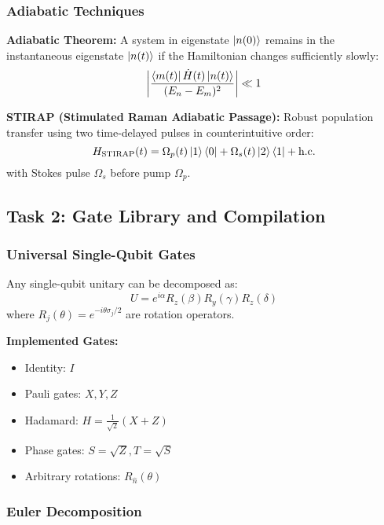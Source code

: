 \documentclass[11pt,a4paper]{article}
\theoremstyle{definition}
\theoremstyle{remark}
\begin{document}
\subsubsection{Adiabatic Techniques}

\textbf{Adiabatic Theorem:} A system in eigenstate $\ket{n(0)}$ remains in the instantaneous eigenstate $\ket{n(t)}$ if the Hamiltonian changes sufficiently slowly:
\begin{equation}
\left|\frac{\bra{m(t)}\dot{H}(t)\ket{n(t)}}{(E_n - E_m)^2}\right| \ll 1
\end{equation}

\textbf{STIRAP (Stimulated Raman Adiabatic Passage):} Robust population transfer using two time-delayed pulses in counterintuitive order:
\begin{equation}
H_{\text{STIRAP}}(t) = \Omega_p(t)\ket{1}\bra{0} + \Omega_s(t)\ket{2}\bra{1} + \text{h.c.}
\end{equation}
with Stokes pulse $\Omega_s$ before pump $\Omega_p$.

\subsection{Task 2: Gate Library and Compilation}

\subsubsection{Universal Single-Qubit Gates}

Any single-qubit unitary can be decomposed as:
\begin{equation}
U = e^{i\alpha}R_z(\beta)R_y(\gamma)R_z(\delta)
\end{equation}
where $R_j(\theta) = e^{-i\theta\sigma_j/2}$ are rotation operators.

\textbf{Implemented Gates:}
\begin{itemize}
    \item Identity: $I$
    \item Pauli gates: $X, Y, Z$
    \item Hadamard: $H = \frac{1}{\sqrt{2}}(X + Z)$
    \item Phase gates: $S = \sqrt{Z}, T = \sqrt{S}$
    \item Arbitrary rotations: $R_{\hat{n}}(\theta)$
\end{itemize}

\subsubsection{Euler Decomposition}
\end{document}

